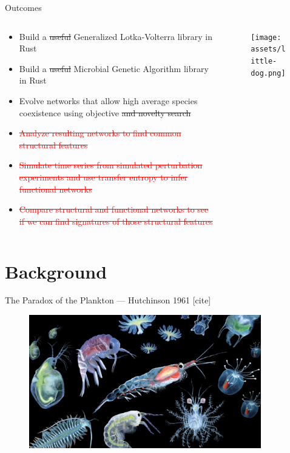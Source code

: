 \documentclass{cubeamer}
\begin{document}
\begin{frame}{Outcomes}
    \begin{columns}
        \begin{column}{0.7\textwidth}
            \begin{itemize}
                \item Build a \sout{useful} Generalized Lotka-Volterra library in Rust
                \item Build a \sout{useful} Microbial Genetic Algorithm library in Rust
                \item Evolve networks that allow high average species coexistence using objective \sout{and novelty search}
                \item \textcolor{red}{\sout{Analyze resulting networks to find common structural features}}
                \item \textcolor{red}{\sout{Simulate time series from simulated perturbation experiments and use transfer entropy to infer functional networks}}
                \item \textcolor{red}{\sout{Compare structural and functional networks to see if we can find signatures of those structural features}}
            \end{itemize}
        \end{column}
        \begin{column}{0.3\textwidth}
            \begin{figure}
                \texttt{[image: assets/little-dog.png]}
            \end{figure}
        \end{column}
    \end{columns}
\end{frame}

\section{Background}

\begin{frame}{The Paradox of the Plankton --- Hutchinson 1961 [cite]}
    \begin{figure}
        \includegraphics[width=0.9\textwidth]{assets/real-plankton.jpeg}
    \end{figure}
\end{frame}
\end{document}
